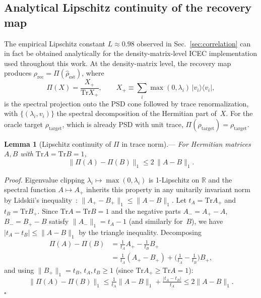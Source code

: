 \documentclass[prx,twocolumn,superscriptaddress,longbibliography,floatfix]{revtex4-2}
\newcommand{\tr}{\mathrm{Tr}}
\newcommand{\rhot}{\rho_\mathrm{target}}
\newcommand{\rhor}{\rho_\mathrm{rec}}
\newcommand{\rhoe}{\hat{\rho}_\mathrm{est}}
\begin{document}
\subsection{Analytical Lipschitz continuity of the recovery map}
\label{sec:lipschitz_proof}

The empirical Lipschitz constant $L \approx 0.98$ observed in Sec.~\ref{sec:correlation} can in fact be obtained analytically for the density-matrix-level ICEC implementation used throughout this work.
At the density-matrix level, the recovery map produces $\rhor = \Pi(\rhoe)$, where
\begin{equation}
\Pi(X) = \frac{X_+}{\tr X_+},\qquad X_+ \equiv \sum_i \max(0,\lambda_i)\,|v_i\rangle\!\langle v_i|,
\label{eq:psd_proj}
\end{equation}
is the spectral projection onto the PSD cone followed by trace renormalization, with $\{(\lambda_i, v_i)\}$ the spectral decomposition of the Hermitian part of~$X$.
For the oracle target $\rhot$, which is already PSD with unit trace, $\Pi(\rhot) = \rhot$.

\noindent\textbf{Lemma 1} (Lipschitz continuity of $\Pi$ in trace norm).---\textit{%
For Hermitian matrices $A, B$ with $\tr A = \tr B = 1$,
\begin{equation}
\|\Pi(A) - \Pi(B)\|_1 \leq 2\,\|A - B\|_1.
\label{eq:lemma_lipschitz}
\end{equation}
}

\noindent\textit{Proof.}
Eigenvalue clipping $\lambda_i \mapsto \max(0, \lambda_i)$ is 1-Lipschitz on $\mathbb{R}$ and the spectral function $A \mapsto A_+$ inherits this property in any unitarily invariant norm by Lidskii's inequality~\cite{NielsenChuang2010}: $\|A_+ - B_+\|_1 \leq \|A - B\|_1$.
Let $t_A = \tr A_+$ and $t_B = \tr B_+$.
Since $\tr A = \tr B = 1$ and the negative parts $A_- = A_+ - A$, $B_- = B_+ - B$ satisfy $\|A_-\|_1 = t_A - 1$ (and similarly for~$B$), we have $|t_A - t_B| \leq \|A - B\|_1$ by the triangle inequality.
Decomposing
\begin{align}
\Pi(A) - \Pi(B) &= \tfrac{1}{t_A}A_+ - \tfrac{1}{t_B}B_+ \nonumber\\
&= \tfrac{1}{t_A}(A_+ - B_+) + \bigl(\tfrac{1}{t_A} - \tfrac{1}{t_B}\bigr)B_+,
\end{align}
and using $\|B_+\|_1 = t_B$, $t_A, t_B \geq 1$ (since $\tr A_+ \geq \tr A = 1$):
\begin{equation}
\|\Pi(A) - \Pi(B)\|_1 \leq \tfrac{1}{t_A}\|A - B\|_1 + \tfrac{|t_A - t_B|}{t_A} \leq 2\|A - B\|_1.
\end{equation}
\hfill$\square$
\end{document}
